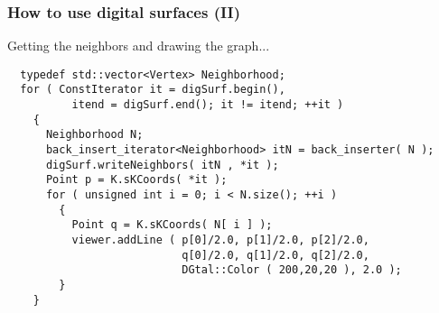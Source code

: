 \documentclass[pdftex,francais]{beamer}
\begin{document}
\begin{frame}[fragile]%
  \frametitle{How to use digital surfaces (II)}

  Getting the neighbors and drawing the graph...

  \begin{lstlisting}
  typedef std::vector<Vertex> Neighborhood;
  for ( ConstIterator it = digSurf.begin(),
          itend = digSurf.end(); it != itend; ++it )
    {
      Neighborhood N;
      back_insert_iterator<Neighborhood> itN = back_inserter( N );
      digSurf.writeNeighbors( itN , *it );
      Point p = K.sKCoords( *it );
      for ( unsigned int i = 0; i < N.size(); ++i )
        {
          Point q = K.sKCoords( N[ i ] );
          viewer.addLine ( p[0]/2.0, p[1]/2.0, p[2]/2.0,
                           q[0]/2.0, q[1]/2.0, q[2]/2.0, 
                           DGtal::Color ( 200,20,20 ), 2.0 );
        }
    }
  \end{lstlisting}
  \vspace{-0.6cm}
  \mbox{~}\hfill{}
\end{frame}
\end{document}
